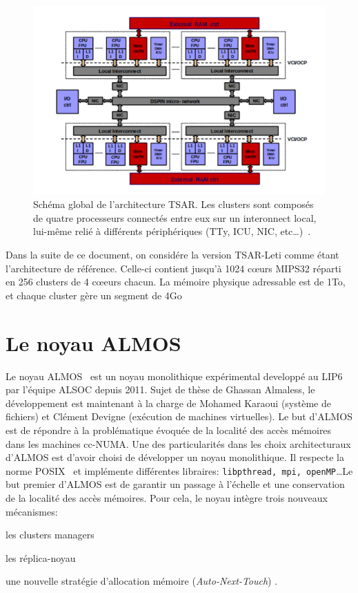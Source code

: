     \begin{figure}[ht]
      \centering \includegraphics[scale=0.241]{include/img/tsar.png}
      \caption{Schéma global de l'architecture TSAR. Les clusters sont composés
        de quatre processeurs connectés entre eux sur un interonnect local,
        lui-même relié à différents périphériques (TTy, ICU, NIC,
        etc\ldots)~\citep{greiner2009tsar}.}
      \label{fig:tsar}
    \end{figure}

    Dans la suite de ce document, on considére la version TSAR-Leti comme étant
    l'architecture de référence. Celle-ci contient jusqu'à 1024 c\oe urs MIPS32
    réparti en 256 clusters de 4 c\oe eurs chacun. La mémoire physique
    adressable est de 1To, et chaque cluster gère un segment de 4Go


  \section{Le noyau ALMOS}
  \label{sec:almos}

    Le noyau ALMOS~\cite{almaless2011almos,almaless2014universite} est un noyau
    monolithique expérimental developpé au LIP6 par l'équipe ALSOC depuis
    2011. Sujet de thèse de Ghassan Almaless, le développement est maintenant à
    la charge de Mohamed Karaoui (système de fichiers) et Clément Devigne
    (exécution de machines virtuelles). Le but d'ALMOS est de répondre à la
    problématique évoquée de la localité des accès mémoires dans les machines
    cc-NUMA. Une des particularités dans les choix architecturaux d'ALMOS est
    d'avoir choisi de développer un noyau monolithique. Il respecte la norme
    POSIX~\cite{posix2013} et implémente différentes libraires:
    \texttt{libpthread, mpi, openMP}\ldots Le but premier d'ALMOS est de
    garantir un passage à l'échelle et une conservation de la localité des accès
    mémoires. Pour cela, le noyau intègre trois nouveaux mécanismes:
    \benumline \item les clusters managers \item les réplica-noyau \item une
    nouvelle stratégie d'allocation mémoire (\textit{Auto-Next-Touch})
    \eenumline.

